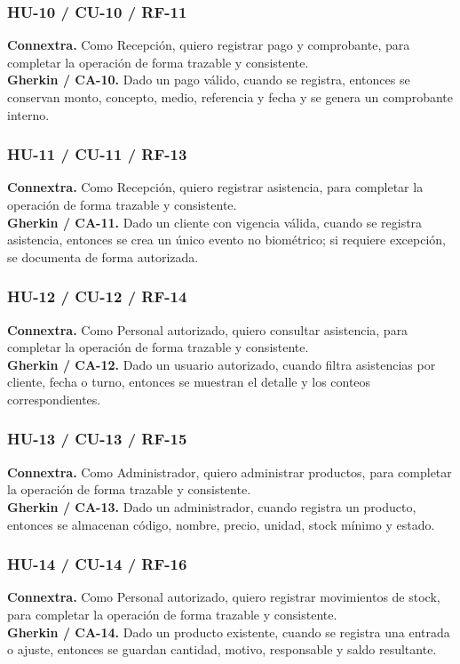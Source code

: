 \documentclass[11pt,a4paper,twoside]{article}
\begin{document}
\subsubsection{HU-10 / CU-10 / RF-11}
\textbf{Connextra.} Como Recepción, quiero registrar pago y comprobante, para completar la operación de forma trazable y consistente.\\
\textbf{Gherkin / CA-10.} Dado un pago válido, cuando se registra, entonces se conservan monto, concepto, medio, referencia y fecha y se genera un comprobante interno.
\subsubsection{HU-11 / CU-11 / RF-13}
\textbf{Connextra.} Como Recepción, quiero registrar asistencia, para completar la operación de forma trazable y consistente.\\
\textbf{Gherkin / CA-11.} Dado un cliente con vigencia válida, cuando se registra asistencia, entonces se crea un único evento no biométrico; si requiere excepción, se documenta de forma autorizada.
\subsubsection{HU-12 / CU-12 / RF-14}
\textbf{Connextra.} Como Personal autorizado, quiero consultar asistencia, para completar la operación de forma trazable y consistente.\\
\textbf{Gherkin / CA-12.} Dado un usuario autorizado, cuando filtra asistencias por cliente, fecha o turno, entonces se muestran el detalle y los conteos correspondientes.
\subsubsection{HU-13 / CU-13 / RF-15}
\textbf{Connextra.} Como Administrador, quiero administrar productos, para completar la operación de forma trazable y consistente.\\
\textbf{Gherkin / CA-13.} Dado un administrador, cuando registra un producto, entonces se almacenan código, nombre, precio, unidad, stock mínimo y estado.
\subsubsection{HU-14 / CU-14 / RF-16}
\textbf{Connextra.} Como Personal autorizado, quiero registrar movimientos de stock, para completar la operación de forma trazable y consistente.\\
\textbf{Gherkin / CA-14.} Dado un producto existente, cuando se registra una entrada o ajuste, entonces se guardan cantidad, motivo, responsable y saldo resultante.
\end{document}
